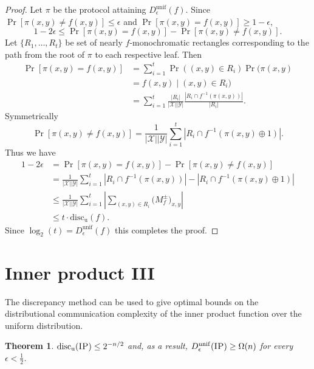 \documentclass[11pt]{amsart}
\theoremstyle{plain}
\newtheorem{theorem}{Theorem}
\theoremstyle{definition}
\theoremstyle{plain}
\newcommand{\calX}{\mathcal{X}}
\newcommand{\calY}{\mathcal{Y}}
\newcommand{\discu}{\mathrm{disc_u}}
\newcommand{\IP}{\textsc{IP}}
\begin{document}
\begin{proof}
Let $\pi$ be the protocol attaining $D_\epsilon^{\mathrm{unif}}(f)$. Since $\Pr[\pi(x,y) \neq f(x,y)] \leq \epsilon$ and $\Pr[\pi(x,y) = f(x,y)] \geq 1-\epsilon$,
$$1-2\epsilon \leq \Pr[\pi(x,y) = f(x,y)] - \Pr[\pi(x,y) \neq f(x,y)].$$
Let $\{R_1, \dots, R_t\}$ be set of nearly $f$-monochromatic rectangles corresponding to the path from the root of $\pi$ to each respective leaf. Then
\begin{align*}\Pr[\pi(x,y) = f(x,y)] &= \sum_{i=1}^t \Pr((x,y) \in R_i)\Pr(\pi(x,y) \\
&= f(x,y) \mid(x,y) \in R_i)\\
&= \sum_{i=1}^t \frac{|R_i|}{|\calX||\calY|}\frac{|R_i\cap f^{-1}(\pi(x,y))|}{|R_i|}.
\end{align*}
Symmetrically
$$\Pr[\pi(x,y) \neq f(x,y)] = \frac{1}{|\calX||\calY|} \sum_{i=1}^t|R_i \cap f^{-1}(\pi(x,y)\oplus 1)|.$$
Thus we have
\begin{align*}1-2\epsilon &= \Pr[\pi(x,y) = f(x,y)] - \Pr[\pi(x,y) \neq f(x,y)] \\
&= \frac{1}{|\calX||\calY|} \sum_{i=1}^t|R_i\cap f^{-1}(\pi(x,y))| -|R_i \cap f^{-1}(\pi(x,y)\oplus 1)| \\
&\leq \frac{1}{|\calX||\calY|} \sum_{i=1}^t  \left| \sum_{(x,y) \in R_i} \big(M^{\pm}_f\big)_{x,y} \right|\\
&\leq t\cdot\discu(f).\end{align*}
Since $\log_2(t) = D_\epsilon^{\mathrm{unif}}(f)$ this completes the proof.
\end{proof}


\newpage \section{Inner product III}

The discrepancy method can be used to give optimal bounds on the distributional communication complexity of the inner product function over the uniform distribution.

\begin{theorem}
$\discu(\IP) \le 2^{-n/2}$ and, as a result, $D_\epsilon^{\mathrm{unif}}(\IP) \ge \Omega(n)$ for every $\epsilon < \frac12$.
\end{theorem}
\end{document}
